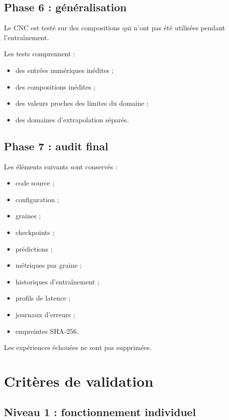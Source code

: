 \documentclass[11pt,a4paper]{article}
\begin{document}
\subsection{Phase 6 : généralisation}

Le CNC est testé sur des compositions qui n'ont pas
été utilisées pendant l'entraînement.

Les tests comprennent :
\begin{itemize}
    \item des entrées numériques inédites ;
    \item des compositions inédites ;
    \item des valeurs proches des limites du domaine ;
    \item des domaines d'extrapolation séparés.
\end{itemize}

\subsection{Phase 7 : audit final}

Les éléments suivants sont conservés :

\begin{itemize}
    \item code source ;
    \item configuration ;
    \item graines ;
    \item checkpoints ;
    \item prédictions ;
    \item métriques par graine ;
    \item historiques d'entraînement ;
    \item profils de latence ;
    \item journaux d'erreurs ;
    \item empreintes SHA-256.
\end{itemize}

Les expériences échouées ne sont pas supprimées.

\section{Critères de validation}

\subsection{Niveau 1 : fonctionnement individuel}
\end{document}
